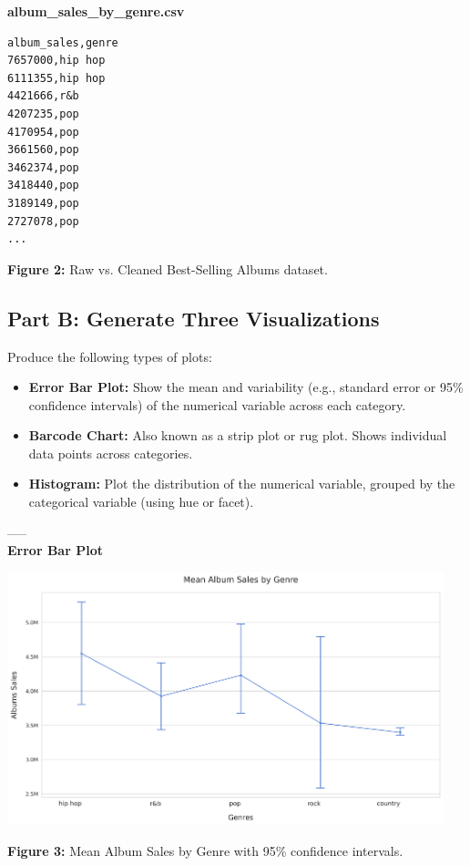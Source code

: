 \noindent\textbf{album\_sales\_by\_genre.csv}
\begin{verbatim}
album_sales,genre
7657000,hip hop
6111355,hip hop
4421666,r&b
4207235,pop
4170954,pop
3661560,pop
3462374,pop
3418440,pop
3189149,pop
2727078,pop
...
\end{verbatim}

\begin{center}
    \textbf{Figure 2:} Raw vs. Cleaned Best-Selling Albums dataset.
\end{center}
\newpage

\subsection{Part B: Generate Three Visualizations}
Produce the following types of plots:
\begin{itemize}
    \item \textbf{Error Bar Plot:} Show the mean and variability (e.g., standard error or 95\% confidence intervals) of the numerical variable across each category.
    \item \textbf{Barcode Chart:} Also known as a strip plot or rug plot. Shows individual data points across categories.
    \item \textbf{Histogram:} Plot the distribution of the numerical variable, grouped by the categorical variable (using hue or facet).
\end{itemize}
-----\\
\textbf{Error Bar Plot}
\begin{center}
  \includegraphics[width=0.95\textwidth]{figures/album_sales_by_genre_error_bar_plot.png}
  
  \textbf{Figure 3:} Mean Album Sales by Genre with 95\% confidence intervals.
\end{center}


